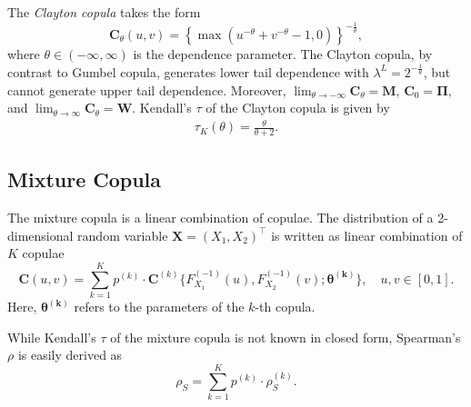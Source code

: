 The {\em Clayton copula\/} takes the form
\begin{equation*}
  \bm{C}_{\theta}(u,v) = \left\{
    \max(u^{-\theta}+v^{-\theta}-1,0)\right\}^{-\frac{1}{\theta}},
\end{equation*}
where $\theta \in (-\infty, \infty)$ is the dependence parameter.
The Clayton copula, by contrast to Gumbel copula,
generates lower tail dependence with $\lambda^L =
2^{-\frac{1}{\theta}}$, but cannot generate upper tail dependence.
Moreover, $\lim_{\theta\rightarrow -\infty} \bm{C}_\theta = \bm{M}$, $\bm{C}_0 =
\bm{\Pi}$, and $\lim_{\theta\rightarrow\infty} \bm{C}_\theta = \bm{W}$. 
Kendall's $\tau$ of the Clayton copula is given by 
\begin{align*}
    \tau_K(\theta) =\frac{\theta}{\theta+2}.
    \end{align*}

\subsection{Mixture Copula}\label{sec:mixture-copula}
The mixture copula is a linear combination of copulae. 
The distribution of a 2-dimensional random variable
$\bm{X}=(X_1,X_2)^\top$ is written as linear combination of $K$
copulae 
\begin{equation*} 
    \bm{C}(u,v)= \sum_{k=1}^K p^{(k)} \cdot \bm{C}^{(k)}\{F^{(-1)}_{X_1}(u),
    F^{(-1)}_{X_2}(v); \bm{\theta^{(k)}}\}, \quad u,v\in [0,1].
  \end{equation*}
  Here, $\bm{\theta^{(k)}}$ refers to the parameters of the
    $k$-th copula.
   
While Kendall's $\tau$ of the mixture copula is not known in closed form,
Spearman's $\rho$ is easily derived as 
\begin{equation*}
  \rho_S = \sum_{k=1}^K p^{(k)} \cdot \rho_S^{(k)}. 
\end{equation*}



